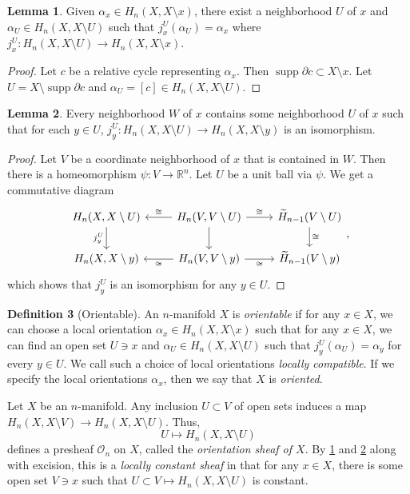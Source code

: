\documentclass[10pt,letterpaper,cm]{nupset}
\theoremstyle{definition}
\newtheorem{definition}{Definition}[subsection]
\theoremstyle{theorem}
\newtheorem{lemma}[definition]{Lemma}
\theoremstyle{remark}
\newcommand{\R}{\mathbb{R}}
\newcommand{\1}{\mathbb{1}}
\newcommand{\0}{\vec 0}
\DeclareMathOperator{\supp}{supp}
\begin{document}
\begin{lemma}\label{lem}
Given $\alpha_x \in H_n(X, X\setminus x)$, there exist a neighborhood $U$ of $x$ and $\alpha_U \in H_n(X, X \setminus U)$ such that $j_x^U(\alpha_U) = \alpha_x$ where $j_x^U : H_n(X, X \setminus U) \to H_n(X, X \setminus x)$.
\end{lemma}
\begin{proof}
Let $c$ be a relative cycle representing $\alpha_x$. Then $\supp{\partial{c}} \subset X \setminus x$. Let $U = X \setminus \supp{\partial{c}}$ and $\alpha_U = [c] \in H_n(X, X\setminus U)$.
\end{proof}

\begin{lemma}\label{lem2}
Every neighborhood $W$ of $x$ contains some neighborhood $U$ of $x$ such that for each $y \in U$, $j_y^U : H_n(X, X\setminus U) \to H_n(X, X\setminus y)$ is an isomorphism. 
\end{lemma}
\begin{proof}
Let $V$ be a coordinate neighborhood of $x$ that is contained in $W$. Then there is a homeomorphism $\psi : V \to \R^n$. Let $U$ be a unit ball via $\psi$. We get a commutative diagram
\[
\begin{tikzcd}
{H_n(X, X \setminus U)} \arrow[d, "j_y^U"'] & {H_n(V, V \setminus U)} \arrow[l, "\cong"'] \arrow[d] \arrow[r, "\cong"] & \widetilde{H}_{n-1}(V \setminus U) \arrow[d, "\cong"] \\
{H_n(X, X\setminus y)}                      & {H_n(V, V \setminus y)} \arrow[l, "\cong"] \arrow[r, "\cong"']           & \widetilde{H}_{n-1}(V \setminus y)                   
\end{tikzcd}
,\] which shows that $j_y^U$ is an isomorphism for any $y \in U$.
\end{proof}

\begin{definition}[Orientable]
An  $n$-manifold $X$ is \textit{orientable} if for any $x\in X$, we can choose a local orientation $\alpha_x \in H_n(X, X \setminus x)$ such that for any $x\in X$, we can find an open set $U \ni x$ and $\alpha_U \in H_n(X, X \setminus U)$ such that $j_y^U(\alpha_U) = \alpha_y$ for every $y\in U$. We call such a choice of local orientations \textit{locally compatible}.  If we specify the local orientations $\alpha_x$, then we say that $X$ is \textit{oriented}. 
\end{definition}


Let $X$ be an $n$-manifold. Any inclusion $U \subset V$ of open sets induces a map $H_n(X, X \setminus V) \to H_n(X, X \setminus U)$. Thus, $$U \mapsto H_n(X, X \setminus U)$$ defines a presheaf $\mathcal{O}_n$ on $X$, called the \textit{orientation sheaf of $X$}. By \cref{lem} and \cref{lem2} along with excision, this is a \textit{locally constant sheaf} in that for any $x\in X$, there is some open set $V \ni x$ such that $U \subset V \mapsto H_n(X, X \setminus U)$ is constant.
\end{document}
